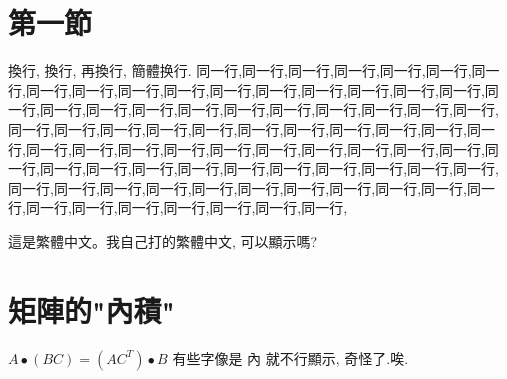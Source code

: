 \documentclass[UTF8]{ctexart}
\begin{document}
\tableofcontents


\section{第一節}
換行, 換行, 再換行, 簡體换行. 同一行,同一行,同一行,同一行,同一行,同一行,同一行,同一行,同一行,同一行,同一行,同一行,同一行,同一行,同一行,同一行,同一行,同一行,同一行,同一行,同一行,同一行,同一行,同一行,同一行,同一行,同一行,同一行,同一行,同一行,同一行,同一行,同一行,同一行,同一行,同一行,同一行,同一行,同一行,同一行,同一行,同一行,同一行,同一行,同一行,同一行,同一行,同一行,同一行,同一行,同一行,同一行,同一行,同一行,同一行,同一行,同一行,同一行,同一行,同一行,同一行,同一行,同一行,同一行,同一行,同一行,同一行,同一行,同一行,同一行,同一行,同一行,同一行,同一行,同一行,同一行,同一行,同一行,

這是繁體中文。我自己打的繁體中文, 可以顯示嗎?


\section{矩陣的"內積"}
$A\bullet(BC) = (AC^{T})\bullet B$
有些字像是 內 就不行顯示, 奇怪了.唉.
\end{document}
